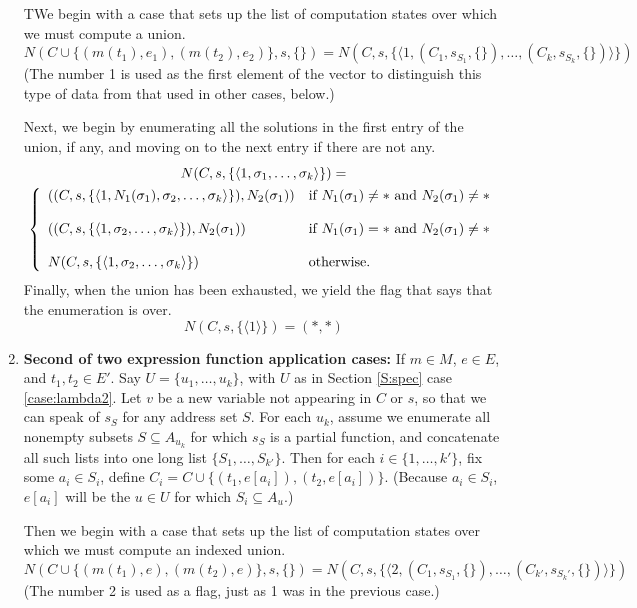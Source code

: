 \documentclass{article}
\begin{document}
\begin{enumerate}
		TWe begin with a case that sets up the list of computation states over which we must compute a union.
		$$
        	N(C\cup\{(m(t_1),e_1),(m(t_2),e_2)\},s,\{\}) = N(C,s,\{\langle1,(C_1,s_{S_1},\{\}),\ldots,(C_k,s_{S_k},\{\})\rangle\})
		$$
		(The number 1 is used as the first element of the vector to distinguish this type of data from that used in other cases, below.)
		
		Next, we begin by enumerating all the solutions in the first entry of the union, if any, and moving on to the next entry if there are not any.
		\begin{multline*}
			N(C,s,\{\langle1,\sigma_1,\ldots,\sigma_k\rangle\}) = \\ \left\{\begin{array}{l l}
				((C,s,\{\langle1,N_1(\sigma_1),\sigma_2,\ldots,\sigma_k\rangle\}),N_2(\sigma_1)) & \text{if $N_1(\sigma_1)\neq*$ and $N_2(\sigma_1)\neq*$} \\
				& \\
				((C,s,\{\langle1,\sigma_2,\ldots,\sigma_k\rangle\}),N_2(\sigma_1)) & \text{if $N_1(\sigma_1)=*$ and $N_2(\sigma_1)\neq*$} \\
				& \\
				N(C,s,\{\langle1,\sigma_2,\ldots,\sigma_k\rangle\}) & \text{otherwise.}
			\end{array}\right.
		\end{multline*}
		Finally, when the union has been exhausted, we yield the flag that says that the enumeration is over.
		$$
			N(C,s,\{\langle1\rangle\}) = (*,*)
		$$
\item	{\bf Second of two expression function application cases:}
		If $m\in M$, $e\in E$, and $t_1,t_2\in E'$.  Say $U=\{u_1,\ldots,u_k\}$, with $U$ as in Section \ref{S:spec} case \ref{case:lambda2}.  Let $v$ be a new variable not appearing in $C$ or $s$, so that we can speak of $s_S$ for any address set $S$.  For each $u_k$, assume we enumerate all nonempty subsets $S\subseteq A_{u_k}$ for which $s_S$ is a partial function, and concatenate all such lists into one long list $\{S_1,\ldots,S_{k'}\}$.  Then for each $i\in\{1,\ldots,k'\}$, fix some $a_i\in S_i$, define $C_i=C\cup\{(t_1,e[a_i]),(t_2,e[a_i])\}$.  (Because $a_i\in S_i$, $e[a_i]$ will be the $u\in U$ for which $S_i\subseteq A_u$.)
        
        Then we begin with a case that sets up the list of computation states over which we must compute an indexed union.
		$$
        	N(C\cup\{(m(t_1),e),(m(t_2),e)\},s,\{\}) = N(C,s,\{\langle2,(C_1,s_{S_1},\{\}),\ldots,(C_{k'},s_{S_k'},\{\})\rangle\})
		$$
		(The number 2 is used as a flag, just as 1 was in the previous case.)
        

\end{enumerate}
\end{document}
